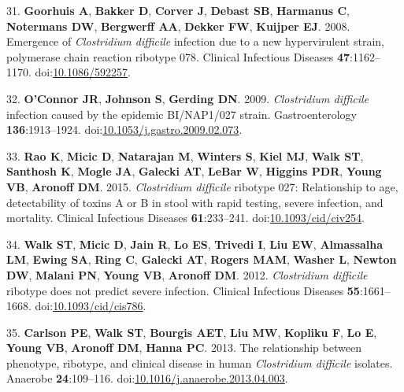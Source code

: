 \documentclass[
  12pt,
]{article}
\newenvironment{cslreferences}%
  {}%
  {\par}
\begin{document}
\begin{cslreferences}
\leavevmode\hypertarget{ref-Goorhuis2008}{}%
31. \textbf{Goorhuis A}, \textbf{Bakker D}, \textbf{Corver J},
\textbf{Debast SB}, \textbf{Harmanus C}, \textbf{Notermans DW},
\textbf{Bergwerff AA}, \textbf{Dekker FW}, \textbf{Kuijper EJ}. 2008.
Emergence of \emph{Clostridium difficile} infection due to a new
hypervirulent strain, polymerase chain reaction ribotype 078. Clinical
Infectious Diseases \textbf{47}:1162--1170.
doi:\href{https://doi.org/10.1086/592257}{10.1086/592257}.

\leavevmode\hypertarget{ref-OConnor2009}{}%
32. \textbf{O'Connor JR}, \textbf{Johnson S}, \textbf{Gerding DN}. 2009.
\emph{Clostridium difficile} infection caused by the epidemic
BI/NAP1/027 strain. Gastroenterology \textbf{136}:1913--1924.
doi:\href{https://doi.org/10.1053/j.gastro.2009.02.073}{10.1053/j.gastro.2009.02.073}.

\leavevmode\hypertarget{ref-Rao2015}{}%
33. \textbf{Rao K}, \textbf{Micic D}, \textbf{Natarajan M},
\textbf{Winters S}, \textbf{Kiel MJ}, \textbf{Walk ST}, \textbf{Santhosh
K}, \textbf{Mogle JA}, \textbf{Galecki AT}, \textbf{LeBar W},
\textbf{Higgins PDR}, \textbf{Young VB}, \textbf{Aronoff DM}. 2015.
\emph{Clostridium difficile} ribotype 027: Relationship to age,
detectability of toxins A or B in stool with rapid testing, severe
infection, and mortality. Clinical Infectious Diseases
\textbf{61}:233--241.
doi:\href{https://doi.org/10.1093/cid/civ254}{10.1093/cid/civ254}.

\leavevmode\hypertarget{ref-Walk2012}{}%
34. \textbf{Walk ST}, \textbf{Micic D}, \textbf{Jain R}, \textbf{Lo ES},
\textbf{Trivedi I}, \textbf{Liu EW}, \textbf{Almassalha LM},
\textbf{Ewing SA}, \textbf{Ring C}, \textbf{Galecki AT}, \textbf{Rogers
MAM}, \textbf{Washer L}, \textbf{Newton DW}, \textbf{Malani PN},
\textbf{Young VB}, \textbf{Aronoff DM}. 2012. \emph{Clostridium
difficile} ribotype does not predict severe infection. Clinical
Infectious Diseases \textbf{55}:1661--1668.
doi:\href{https://doi.org/10.1093/cid/cis786}{10.1093/cid/cis786}.

\leavevmode\hypertarget{ref-Carlson2013}{}%
35. \textbf{Carlson PE}, \textbf{Walk ST}, \textbf{Bourgis AET},
\textbf{Liu MW}, \textbf{Kopliku F}, \textbf{Lo E}, \textbf{Young VB},
\textbf{Aronoff DM}, \textbf{Hanna PC}. 2013. The relationship between
phenotype, ribotype, and clinical disease in human \emph{Clostridium
difficile} isolates. Anaerobe \textbf{24}:109--116.
doi:\href{https://doi.org/10.1016/j.anaerobe.2013.04.003}{10.1016/j.anaerobe.2013.04.003}.


\end{cslreferences}
\end{document}
